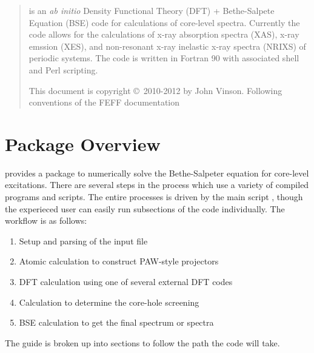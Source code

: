 \documentclass[11pt]{report}
\begin{document}
\MakeTitle

\newchapter{}
\begin{abstract}
 is an {\it ab initio} Density Functional Theory (DFT) + Bethe-Salpete Equation (BSE) code for calculations of core-level 
spectra. Currently the code allows for the calculations of x-ray absorption spectra (XAS), x-ray emssion (XES), and non-resonant x-ray 
inelastic x-ray spectra (NRIXS) of periodic systems. The code is written in Fortran 90 with associated shell and Perl scripting.




 \noindent This document is copyright \copyright\ 2010-2012 by John Vinson. Following conventions of the FEFF documentation

\end{abstract}

\newchapter{}
\tableofcontents
\newchapter{}

\setcounter{page}{1}


\chapter{Package Overview}



 provides a package to numerically solve the Bethe-Salpeter equation for core-level excitations. 
There are several steps in the process which use a variety of compiled programs and scripts. 
The entire processes is driven by the main script , though the experieced user 
can easily run subsections of the code individually.
The  workflow is as follows:

\begin{enumerate}
\item Setup and parsing of the input file
\item Atomic calculation to construct PAW-style projectors
\item DFT calculation using one of several external DFT codes
\item Calculation to determine the core-hole screening
\item BSE calculation to get the final spectrum or spectra
\end{enumerate}

The guide is broken up into sections to follow the path the code will take. 
\end{document}
